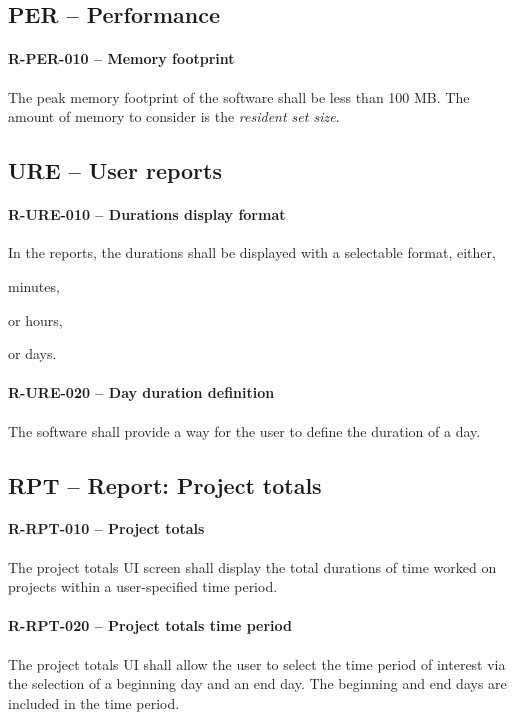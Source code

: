 \subsection{PER -- Performance}
\paragraph{R-PER-010 -- Memory footprint}
The peak memory footprint of the software shall be less than 100 MB.
The amount of memory to consider is the \emph{resident set size}.

\subsection{URE -- User reports}
\paragraph{R-URE-010 -- Durations display format}
In the reports, the durations shall be displayed with a selectable format,
either,
\begin{compactitem}
  \item minutes,
  \item or hours,
  \item or days.
\end{compactitem}

\paragraph{R-URE-020 -- Day duration definition}
The software shall provide a way for the user to define the duration of a day.

\subsection{RPT -- Report: Project totals}
\paragraph{R-RPT-010 -- Project totals}
The project totals \gls{UI} screen shall display the total durations of time
worked on projects within a user-specified time period.

\paragraph{R-RPT-020 -- Project totals time period}
The project totals \gls{UI} shall allow the user to select the time period
of interest via the selection of a beginning day and an end day. The
beginning and end days are included in the time period.

